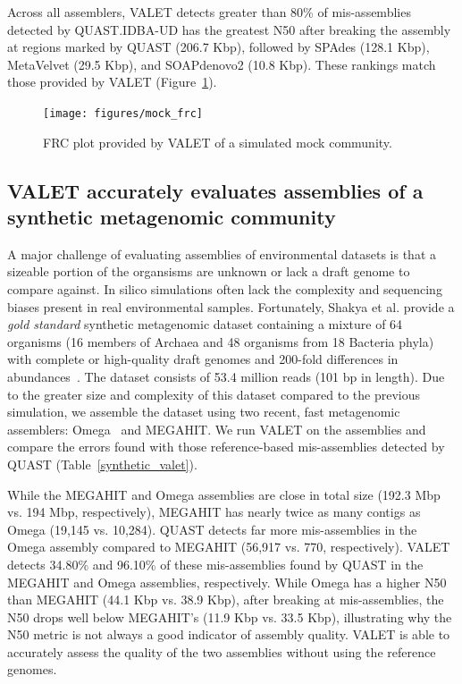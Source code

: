 \documentclass[12pt,\mydriver]{thesis}
\begin{document}
Across all assemblers, VALET detects greater than 80\% of mis-assemblies detected by QUAST.IDBA-UD has the greatest N50 after breaking the assembly at regions marked by QUAST (206.7 Kbp), followed by SPAdes (128.1 Kbp), MetaVelvet (29.5 Kbp), and SOAPdenovo2 (10.8 Kbp).
These rankings match those provided by VALET (Figure~\ref{fig:mock_frc}).



\begin{figure}[tb!]
\begin{center}
\texttt{[image: figures/mock\_frc]}
\end{center}
\renewcommand{\baselinestretch}{1}
\small\normalsize
\begin{quote}
\caption[RC plot of a simulated mock community]{FRC plot provided by VALET of a simulated mock community.}
\label{fig:mock_frc}
\end{quote}
\end{figure}
\renewcommand{\baselinestretch}{2}
\small\normalsize


\subsection{VALET accurately evaluates assemblies of a synthetic metagenomic community}

A major challenge of evaluating assemblies of environmental datasets is that a sizeable portion of the organsisms are unknown or lack a draft genome to compare against.
In silico simulations often lack the complexity and sequencing biases present in real environmental samples.
Fortunately, Shakya et al. provide a \emph{gold standard} synthetic metagenomic dataset containing a mixture of 64 organisms (16 members of Archaea and 48 organisms from 18 Bacteria phyla) with complete or high-quality draft genomes and 200-fold differences in abundances~\cite{shakya2013comparative}.
The dataset consists of 53.4 million reads (101 bp in length).
Due to the greater size and complexity of this dataset compared to the previous simulation, we assemble the dataset using two recent, fast metagenomic assemblers: Omega~\cite{haider2014omega} and MEGAHIT\cite{li2015megahit}.
We run VALET on the assemblies and compare the errors found with those reference-based mis-assemblies detected by QUAST (Table~\ref{synthetic_valet}).


While the MEGAHIT and Omega assemblies are close in total size (192.3 Mbp vs. 194 Mbp, respectively), MEGAHIT has nearly twice as many contigs as Omega (19,145 vs. 10,284).
QUAST detects far more mis-assemblies in the Omega assembly compared to MEGAHIT (56,917 vs. 770, respectively).
VALET detects 34.80\% and 96.10\% of these mis-assemblies found by QUAST in the MEGAHIT and Omega assemblies, respectively.
While Omega has a higher N50 than MEGAHIT (44.1 Kbp vs. 38.9 Kbp), after breaking at mis-assemblies, the N50 drops well below MEGAHIT's (11.9 Kbp vs. 33.5 Kbp), illustrating why the N50 metric is not always a good indicator of assembly quality.
VALET is able to accurately assess the quality of the two assemblies without using the reference genomes.
\end{document}
